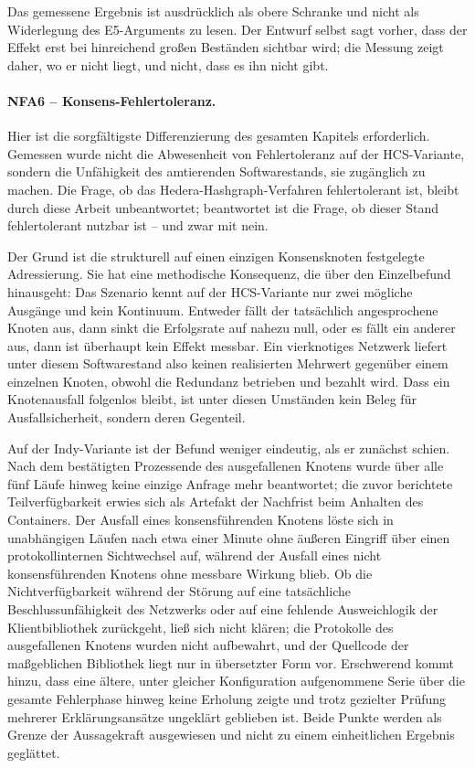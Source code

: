 Das gemessene Ergebnis ist ausdrücklich als obere Schranke und nicht als Widerlegung des E5-Arguments zu lesen. Der Entwurf selbst sagt vorher, dass der Effekt erst bei hinreichend großen Beständen sichtbar wird; die Messung zeigt daher, wo er nicht liegt, und nicht, dass es ihn nicht gibt.

\paragraph{NFA6 -- Konsens-Fehlertoleranz.} Hier ist die sorgfältigste Differenzierung des gesamten Kapitels erforderlich. Gemessen wurde nicht die Abwesenheit von Fehlertoleranz auf der HCS-Variante, sondern die Unfähigkeit des amtierenden Softwarestands, sie zugänglich zu machen. Die Frage, ob das Hedera-Hashgraph-Verfahren fehlertolerant ist, bleibt durch diese Arbeit unbeantwortet; beantwortet ist die Frage, ob dieser Stand fehlertolerant nutzbar ist -- und zwar mit nein.

Der Grund ist die strukturell auf einen einzigen Konsensknoten festgelegte Adressierung. Sie hat eine methodische Konsequenz, die über den Einzelbefund hinausgeht: Das Szenario kennt auf der HCS-Variante nur zwei mögliche Ausgänge und kein Kontinuum. Entweder fällt der tatsächlich angesprochene Knoten aus, dann sinkt die Erfolgsrate auf nahezu null, oder es fällt ein anderer aus, dann ist überhaupt kein Effekt messbar. Ein vierknotiges Netzwerk liefert unter diesem Softwarestand also keinen realisierten Mehrwert gegenüber einem einzelnen Knoten, obwohl die Redundanz betrieben und bezahlt wird. Dass ein Knotenausfall folgenlos bleibt, ist unter diesen Umständen kein Beleg für Ausfallsicherheit, sondern deren Gegenteil.

Auf der Indy-Variante ist der Befund weniger eindeutig, als er zunächst schien. Nach dem bestätigten Prozessende des ausgefallenen Knotens wurde über alle fünf Läufe hinweg keine einzige Anfrage mehr beantwortet; die zuvor berichtete Teilverfügbarkeit erwies sich als Artefakt der Nachfrist beim Anhalten des Containers. Der Ausfall eines konsensführenden Knotens löste sich in unabhängigen Läufen nach etwa einer Minute ohne äußeren Eingriff über einen protokollinternen Sichtwechsel auf, während der Ausfall eines nicht konsensführenden Knotens ohne messbare Wirkung blieb. Ob die Nichtverfügbarkeit während der Störung auf eine tatsächliche Beschlussunfähigkeit des Netzwerks oder auf eine fehlende Ausweichlogik der Klientbibliothek zurückgeht, ließ sich nicht klären; die Protokolle des ausgefallenen Knotens wurden nicht aufbewahrt, und der Quellcode der maßgeblichen Bibliothek liegt nur in übersetzter Form vor. Erschwerend kommt hinzu, dass eine ältere, unter gleicher Konfiguration aufgenommene Serie über die gesamte Fehlerphase hinweg keine Erholung zeigte und trotz gezielter Prüfung mehrerer Erklärungsansätze ungeklärt geblieben ist. Beide Punkte werden als Grenze der Aussagekraft ausgewiesen und nicht zu einem einheitlichen Ergebnis geglättet.

